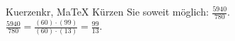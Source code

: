 \begin{MAufgabe}{Kuerzen}{kr, MaTeX}
K\"urzen Sie soweit m\"oglich: $\frac{5940}{780}$.\\ 
\ifLsg\MLoesung
\quad $\frac{5940}{780}=\frac{(60)\cdot(99)}{(60)\cdot(13)}=\frac{99}{13}$.\else\relax\fi
 \end{MAufgabe}